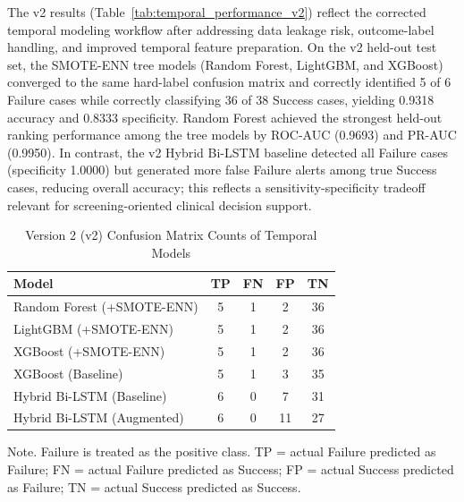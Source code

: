 \documentclass[12pt]{article}
\begin{document}
The v2 results (Table~\ref{tab:temporal_performance_v2}) reflect the corrected temporal modeling workflow after addressing data leakage risk, outcome-label handling, and improved temporal feature preparation. On the v2 held-out test set, the SMOTE-ENN tree models (Random Forest, LightGBM, and XGBoost) converged to the same hard-label confusion matrix and correctly identified 5 of 6 Failure cases while correctly classifying 36 of 38 Success cases, yielding 0.9318 accuracy and 0.8333 specificity. Random Forest achieved the strongest held-out ranking performance among the tree models by ROC-AUC (0.9693) and PR-AUC (0.9950). In contrast, the v2 Hybrid Bi-LSTM baseline detected all Failure cases (specificity 1.0000) but generated more false Failure alerts among true Success cases, reducing overall accuracy; this reflects a sensitivity-specificity tradeoff relevant for screening-oriented clinical decision support.

\begin{table}[H]
\caption{Version 2 (v2) Confusion Matrix Counts of Temporal Models}
\label{tab:temporal_confusion_v2}
\small
\begin{tabular}{lcccc}
\toprule
Model & TP & FN & FP & TN \\
\midrule
Random Forest (+SMOTE-ENN) & 5 & 1 & 2 & 36 \\
LightGBM (+SMOTE-ENN) & 5 & 1 & 2 & 36 \\
XGBoost (+SMOTE-ENN) & 5 & 1 & 2 & 36 \\
XGBoost (Baseline) & 5 & 1 & 3 & 35 \\
Hybrid Bi-LSTM (Baseline) & 6 & 0 & 7 & 31 \\
Hybrid Bi-LSTM (Augmented) & 6 & 0 & 11 & 27 \\
\bottomrule
\end{tabular}

\begin{flushleft}
\footnotesize
Note. Failure is treated as the positive class. TP = actual Failure predicted as Failure; FN = actual Failure predicted as Success; FP = actual Success predicted as Failure; TN = actual Success predicted as Success.
\end{flushleft}
\end{table}
\end{document}
